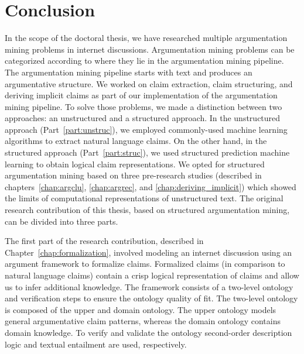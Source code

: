 \chapter{Conclusion}
\label{chap:conclusion}


In the scope of the doctoral thesis, we have researched multiple argumentation
mining problems in internet discussions.  Argumentation mining
problems can be categorized according to where they lie in the argumentation
mining pipeline. The argumentation mining pipeline starts with text and
produces an argumentative structure. 
We worked on claim extraction, claim
structuring, and deriving implicit claims as part of our implementation of the
argumentation mining pipeline. To solve those problems, we made a distinction
between two approaches: an unstructured and a structured approach. In the
unstructured approach (Part~\ref{part:unstruc}), we employed commonly-used machine
learning algorithms to extract natural language claims. On the other hand, in
the structured approach (Part~\ref{part:struc}), we used structured prediction
machine learning to obtain logical claim representations. 
We opted for structured argumentation mining based on three pre-research studies
(described in chapters~\ref{chap:argclu}, \ref{chap:argrec}, and
\ref{chap:deriving_implicit}) which showed the limits of computational
representations of unstructured text.  
The original research contribution of this thesis, based on 
structured argumentation mining, can be divided into three parts. 

The first part of the research contribution, described in
Chapter~\ref{chap:formalization}, involved modeling an internet discussion using an
argument framework to formalize claims.  
Formalized claims (in comparison to natural language claims) contain a crisp
logical representation of claims and allow us to infer additional knowledge. 
The framework consists of a two-level
ontology and verification steps to ensure the ontology quality of fit.  The
two-level ontology is composed of the upper and domain ontology.  The upper
ontology models general argumentative claim patterns, whereas the domain
ontology contains domain knowledge. To verify and validate the ontology
second-order description logic and textual entailment are used, respectively. 


